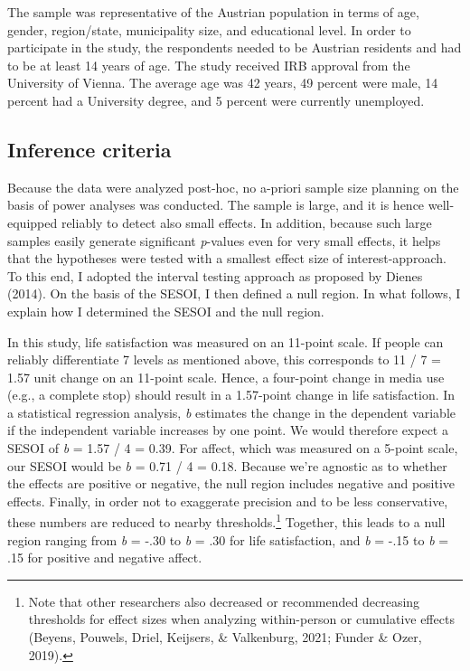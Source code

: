 \documentclass[
  english,
  man,mask,floatsintext]{apa6}
\begin{document}
The sample was representative of the Austrian population in terms of age, gender, region/state, municipality size, and educational level.
In order to participate in the study, the respondents needed to be Austrian residents and had to be at least 14 years of age.
The study received IRB approval from the University of Vienna.
The average age was 42 years, 49 percent were male, 14 percent had a University degree, and 5 percent were currently unemployed.

\hypertarget{inference-criteria}{%
\subsection{Inference criteria}\label{inference-criteria}}

Because the data were analyzed post-hoc, no a-priori sample size planning on the basis of power analyses was conducted.
The sample is large, and it is hence well-equipped reliably to detect also small effects.
In addition, because such large samples easily generate significant \emph{p}-values even for very small effects, it helps that the hypotheses were tested with a smallest effect size of interest-approach.
To this end, I adopted the interval testing approach as proposed by Dienes (2014).
On the basis of the SESOI, I then defined a null region.
In what follows, I explain how I determined the SESOI and the null region.

In this study, life satisfaction was measured on an 11-point scale.
If people can reliably differentiate 7 levels as mentioned above, this corresponds to 11 / 7 = 1.57 unit change on an 11-point scale.
Hence, a four-point change in media use (e.g., a complete stop) should result in a 1.57-point change in life satisfaction.
In a statistical regression analysis, \emph{b} estimates the change in the dependent variable if the independent variable increases by one point.
We would therefore expect a SESOI of \emph{b} = 1.57 / 4 = 0.39.
For affect, which was measured on a 5-point scale, our SESOI would be \emph{b} = 0.71 / 4 = 0.18.
Because we're agnostic as to whether the effects are positive or negative, the null region includes negative and positive effects.
Finally, in order not to exaggerate precision and to be less conservative, these numbers are reduced to nearby thresholds.\footnote{Note that other researchers also decreased or recommended decreasing thresholds for effect sizes when analyzing within-person or cumulative effects (Beyens, Pouwels, Driel, Keijsers, \& Valkenburg, 2021; Funder \& Ozer, 2019).}
Together, this leads to a null region ranging from \emph{b} = -.30 to \emph{b} = .30 for life satisfaction, and \emph{b} = -.15 to \emph{b} = .15 for positive and negative affect.
\end{document}
